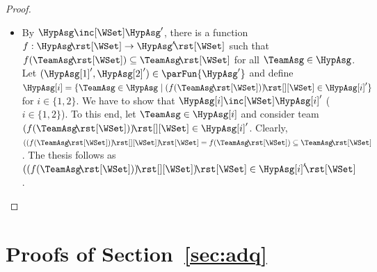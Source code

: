 \documentclass[authoryear]{elsarticle}
\begin{document}
\begin{proof}
\begin{itemize}
  \item[\ref{lmm:mon(par-unrestricted)})]
    By $\HypAsg \inc[\WSet] \HypAsg'$, there is a function $f : \HypAsg
    \!\rst[\WSet] \rightarrow \HypAsg' \!\rst[\WSet]$ such that $f(\TeamAsg
    \!\rst[\WSet]) \subseteq \TeamAsg \!\rst[\WSet]$ for all $\TeamAsg \in
    \HypAsg$.
%
    Let $(\HypAsg[1]', \HypAsg[2]') \in \parFun{\HypAsg'}$ and define
    $\HypAsg[i] = \{ \TeamAsg \in \HypAsg \mid \asgExtW{(f(\TeamAsg
      \!\rst[\WSet]))} \in \HypAsg[i]' \}$ for $i \in \{ 1,2 \}$.
    We have to show that $\HypAsg[i] \inc[\WSet] \HypAsg[i]'$ ($i \in \{ 1,2
    \}$).
    To this end, let $\TeamAsg \in \HypAsg[i]$ and consider team
    $\asgExtW{(f(\TeamAsg \!\rst[\WSet]))} \in \HypAsg[i]'$.
    Clearly, $(\asgExtW{(f(\TeamAsg \!\rst[\WSet]))}) \!\rst[\WSet] = f(\TeamAsg
    \!\rst[\WSet]) \subseteq \TeamAsg \!\rst[\WSet]$.
    The thesis follows as $(\asgExtW{(f(\TeamAsg \!\rst[\WSet]))}) \!\rst[\WSet]
    \in \HypAsg[i]' \!\rst[\WSet]$.
%
    \qedhere
  \end{itemize}

\end{proof}







\section{Proofs of Section~\ref{sec:adq}}
\label{app:adq}
\end{document}
